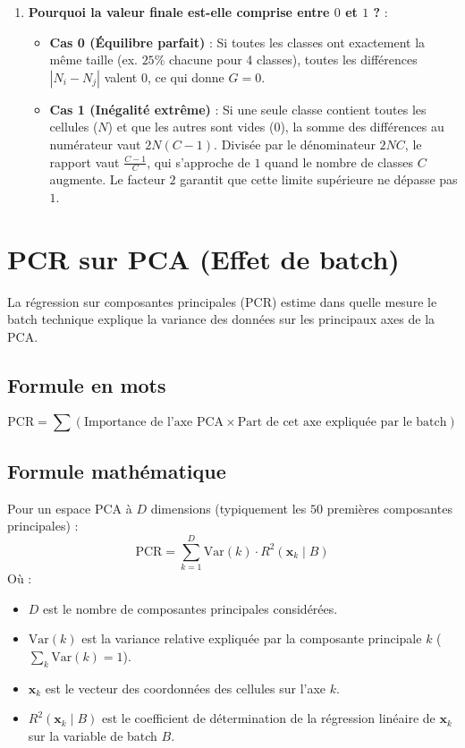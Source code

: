 \documentclass[11pt,a4paper]{article}
\begin{document}
\begin{enumerate}
    \item \textbf{Pourquoi la valeur finale est-elle comprise entre $0$ et $1$ ?} :
    \begin{itemize}
        \item \textbf{Cas 0 (Équilibre parfait)} : Si toutes les classes ont exactement la même taille (ex. $25\%$ chacune pour 4 classes), toutes les différences $|N_i - N_j|$ valent $0$, ce qui donne $G = 0$.
        \item \textbf{Cas 1 (Inégalité extrême)} : Si une seule classe contient toutes les cellules ($N$) et que les autres sont vides ($0$), la somme des différences au numérateur vaut $2N(C-1)$. Divisée par le dénominateur $2NC$, le rapport vaut $\frac{C-1}{C}$, qui s'approche de $1$ quand le nombre de classes $C$ augmente. Le facteur $2$ garantit que cette limite supérieure ne dépasse pas $1$.
    \end{itemize}
\end{enumerate}

\section{PCR sur PCA (Effet de batch)}

La régression sur composantes principales (PCR) estime dans quelle mesure le batch technique explique la variance des données sur les principaux axes de la PCA.

\subsection{Formule en mots}
\[
\text{PCR} = \sum \left( \text{Importance de l'axe PCA} \times \text{Part de cet axe expliquée par le batch} \right)
\]

\subsection{Formule mathématique}
Pour un espace PCA à $D$ dimensions (typiquement les $50$ premières composantes principales) :
\[
\text{PCR} = \sum_{k=1}^{D} \text{Var}(k) \cdot R^2(\mathbf{x}_k \mid B)
\]
Où :
\begin{itemize}
    \item $D$ est le nombre de composantes principales considérées.
    \item $\text{Var}(k)$ est la variance relative expliquée par la composante principale $k$ ($\sum_k \text{Var}(k) = 1$).
    \item $\mathbf{x}_k$ est le vecteur des coordonnées des cellules sur l'axe $k$.
    \item $R^2(\mathbf{x}_k \mid B)$ est le coefficient de détermination de la régression linéaire de $\mathbf{x}_k$ sur la variable de batch $B$.
\end{itemize}
\end{document}
